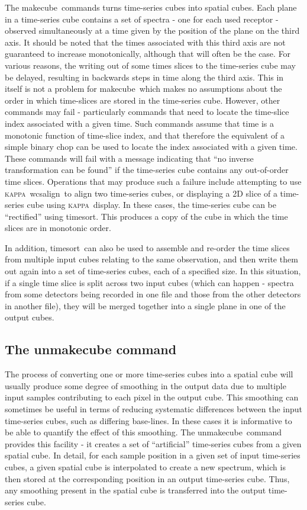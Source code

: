 \documentclass[twoside,11pt]{article}
\newcommand{\xref}[3]{#1}
\renewcommand{\_}{\texttt{\symbol{95}}}
\newcommand{\KAPPA}{\textsc{kappa}}
\newcommand{\task}[1]{\textsf{#1}}
\newcommand{\makecube}{\xref{\task{makecube}}{sun258}{MAKECUBE}}
\newcommand{\timesort}{\xref{\task{timesort}}{sun258}{TIMESORT}}
\newcommand{\unmakecube}{\xref{\task{unmakecube}}{sun258}{UNMAKECUBE}}
\newcommand{\wcsalign}{\xref{\task{wcsalign}}{sun95}{WCSALIGN}}
\newcommand{\display}{\xref{\task{display}}{sun95}{DISPLAY}}
\begin{document}
The \makecube\ commands turns time-series cubes into spatial cubes. Each
plane in a time-series cube contains a set of spectra - one for each
used receptor - observed simultaneously at a time given by the position
of the plane on the third axis. It should be noted that the times
associated with this third axis are not guaranteed to increase
monotonically, although that will often be the case. For various reasons,
the writing out of some times slices to the time-series cube may be delayed,
resulting in backwards steps in time along the third axis. This in itself
is not a problem for \makecube\, which makes no assumptions about the
order in which time-slices are stored in the time-series cube. However,
other commands may fail - particularly commands that need to locate the
time-slice index associated with a given time. Such commands assume that
time is a monotonic function of time-slice index, and that therefore the
equivalent of a simple binary chop can be used to locate the index
associated with a given time. These commands will fail with a message
indicating that ``no inverse transformation can be found'' if the
time-series cube contains any out-of-order time slices. Operations that
may produce such a failure include attempting to use \KAPPA\ \wcsalign\
to align two time-series cubes, or displaying a 2D slice of a time-series
cube using \KAPPA\ \display. In these cases, the time-series cube can be
``rectified'' using \timesort. This produces a copy of the cube in which
the time slices are in monotonic order.

In addition, \timesort\ can also be used to assemble and re-order the time
slices from multiple input cubes relating to the same observation, and then
write them out again into a set of time-series cubes, each of a specified
size. In this situation, if a single time slice is split across two
input cubes (which can happen - spectra from some detectors being recorded
in one file and those from the other detectors in another file), they
will be merged together into a single plane in one of the output cubes.


\subsection{The unmakecube command}

The process of converting one or more time-series cubes into a spatial
cube will usually produce some degree of smoothing in the output data due
to multiple input samples contributing to each pixel in the output cube.
This smoothing can sometimes be useful in terms of reducing systematic
differences between the input time-series cubes, such as differing
base-lines. In these cases it is informative to be able to quantify the
effect of this smoothing. The \unmakecube\ command provides this facility
- it creates a set of ``artificial'' time-series cubes from a given
spatial cube. In detail, for each sample position in a given set of input
time-series cubes, a given spatial cube is interpolated to create a new
spectrum, which is then stored at the corresponding position in an output
time-series cube. Thus, any smoothing present in the spatial cube is
transferred into the output time-series cube.
\end{document}
